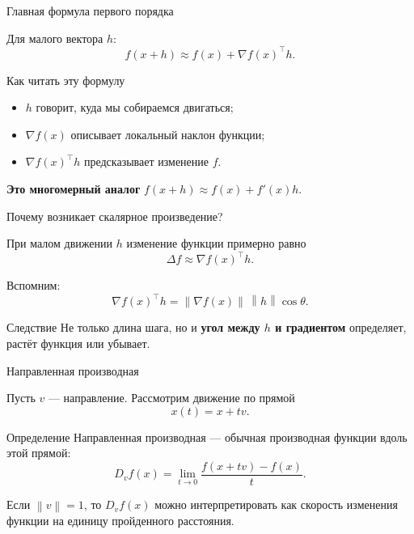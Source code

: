 \documentclass[aspectratio=169,10pt]{beamer}
\newcommand{\norm}[1]{\left\lVert #1\right\rVert}
\newcommand{\grad}{\nabla}
\begin{document}
\begin{frame}{Главная формула первого порядка}
\vspace{0.6em}

Для малого вектора $h$:
\[
  \boxed{
  f(x+h)\approx f(x)+\grad f(x)^\top h.
  }
\]

\begin{block}{Как читать эту формулу}
\begin{itemize}
  \item $h$ говорит, куда мы собираемся двигаться;
  \item $\grad f(x)$ описывает локальный наклон функции;
  \item $\grad f(x)^\top h$ предсказывает изменение $f$.
\end{itemize}
\end{block}

\vspace{0.3em}
\centering
\textbf{Это многомерный аналог } $f(x+h)\approx f(x)+f'(x)h$.

\end{frame}

\begin{frame}{Почему возникает скалярное произведение?}
\vspace{0.5em}

При малом движении $h$ изменение функции примерно равно
\[
  \Delta f\approx \grad f(x)^\top h.
\]

Вспомним:
\[
  \grad f(x)^\top h
  =
  \norm{\grad f(x)}\,\norm{h}\cos\theta.
\]

\begin{alertblock}{Следствие}
\centering
Не только длина шага, но и \textbf{угол между $h$ и градиентом} определяет, растёт функция или убывает.
\end{alertblock}

\end{frame}

\begin{frame}{Направленная производная}
\vspace{0.45em}

Пусть $v$ --- направление. Рассмотрим движение по прямой
\[
  x(t)=x+tv.
\]

\begin{block}{Определение}
Направленная производная --- обычная производная функции вдоль этой прямой:
\[
  D_vf(x)
  =
  \lim_{t\to0}
  \frac{f(x+tv)-f(x)}{t}.
\]
\end{block}

\small
Если $\norm{v}=1$, то $D_vf(x)$ можно интерпретировать как скорость изменения функции на единицу пройденного расстояния.

\end{frame}
\end{document}
